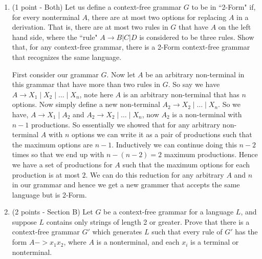 \documentclass[11pt]{article}
\begin{document}
\begin{enumerate}
\begin{enumerate}
\begin{answer}
  Now for a string of length $1$, clearly we just have one step i.e one production. So we have, $P(1) = 1, P(2) = P(1) + 2 = 3, \dots$. So for an arbitrary $n$ we can solve this recursion by expanding it as follows, 
  \begin{align*}
    P(n) &= P(n - 1) + 2 \\
    &=P(n - 2) + 2 + 2 \\
    &= \dots \\
    &= P(1) + (n - 1)  \cdot 2\\
    &= 1 + 2n - 2 = 2n - 1
  \end{align*}

  So for a given string of length $n$ the total steps are $2n - 1$
\end{answer}

\item (1 point - Both) Let us define a context-free grammar $G$ to be in ``2-Form" if, for every nonterminal $A$, there are at most two options for replacing $A$ in a derivation. That is, there are at most two rules in $G$ that have $A$ on the left hand side, where the ``rule" $A \rightarrow B | C | D$ is considered to be three rules. Show that, for any context-free grammar, there is a 2-Form context-free grammar that recognizes the same language. 

\begin{answer}
  First consider our grammar $G$. Now let $A$ be an arbitrary non-terminal in this grammar that have more than two rules in $G$. So say we have $A \to X_{1} \mid X_{2} \mid \dots \mid X_n$, note here $A$ is an arbitrary non-terminal that has $n$ options. Now simply define a new non-terminal $A_{2} \to X_{2} \mid \dots \mid X_n$. So we have, $A \to X_{1} \mid A_{2}$ and $A_{2} \to X_{2} \mid \dots \mid X_n$, now $A_{2}$ is a non-terminal with $n - 1$ productions. So essentially we showed that for any arbitrary non-terminal $A$ with $n$ options we can write it as a pair of productions such that the maximum options are $n - 1$. Inductively we can continue doing this $n - 2$ times so that we end up with $n - (n - 2) = 2$ maximum productions. Hence we have a set of productions for $A$ such that the maximum options for each production is at most $2$. We can do this reduction for any arbitrary $A$ and $n$ in our grammar and hence we get a new grammer that accepts the same language but is 2-Form.
\end{answer}
    
\item (2 points - Section B) Let $G$ be a context-free grammar for a language $L$, and suppose $L$ contains only strings of length 2 or greater. Prove that there is a context-free grammar $G'$ which generates $L$ such that every rule of $G'$ has the form $A -> x_1x_2$, where $A$ is a nonterminal, and each $x_i$ is a terminal or nonterminal.


\end{enumerate}
\end{enumerate}
\end{document}
